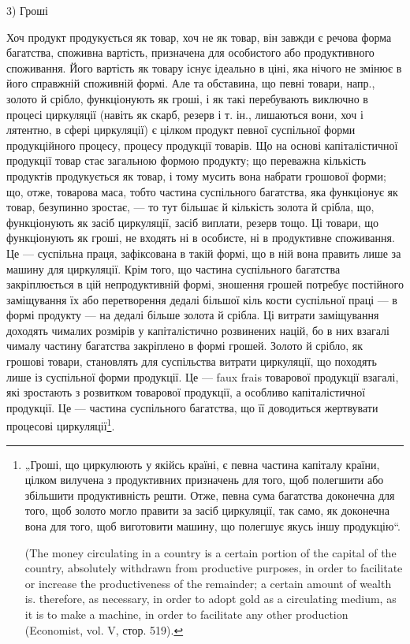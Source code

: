 3) Гроші

Хоч продукт продукується як товар, хоч не як товар, він завжди є
речова форма багатства, споживна вартість, призначена для особистого
або продуктивного споживання. Його вартість як товару існує ідеально
в ціні, яка нічого не змінює в його справжній споживній формі. Але та
обставина, що певні товари, напр., золото й срібло, функціонують як
гроші, і як такі перебувають виключно в процесі циркуляції (навіть як
скарб, резерв і т. ін., лишаються вони, хоч і лятентно, в сфері
циркуляції) є цілком продукт певної суспільної форми продукційного
процесу, процесу продукції товарів. Що на основі капіталістичної продукції
товар стає загальною формою продукту; що переважна кількість
продуктів продукується як товар, і тому мусить вона набрати грошової
форми; що, отже, товарова маса, тобто частина суспільного багатства,
яка функціонує як товар, безупинно зростає, — то тут більшає й кількість
золота й срібла, що, функціонують як засіб циркуляції, засіб виплати,
резерв тощо. Ці товари, що функціонують як гроші, не входять ні в
особисте, ні в продуктивне споживання. Це — суспільна праця, зафіксована
в такій формі, що в ній вона править лише за машину для циркуляції.
Крім того, що частина суспільного багатства закріплюється в цій
непродуктивній формі, зношення грошей потребує постійного заміщування
їх або перетворення дедалі більшої кіль кости суспільної праці — в
формі продукту — на дедалі більше золота й срібла. Ці витрати заміщування
доходять чималих розмірів у капіталістично розвинених націй, бо
в них взагалі чималу частину багатства закріплено в формі грошей.
Золото й срібло, як грошові товари, становлять для суспільства витрати
циркуляції, що походять лише із суспільної форми продукції. Це — faux frais
товарової продукції взагалі, які зростають з розвитком товарової продукції,
а особливо капіталістичної продукції. Це — частина суспільного
багатства, що її доводиться жертвувати процесові циркуляції\footnote{
„Гроші, що циркулюють у якійсь країні, є певна частина капіталу
країни, цілком вилучена з продуктивних призначень для того, щоб полегшити
або збільшити продуктивність решти. Отже, певна сума багатства доконечна
для того, щоб золото могло правити за засіб циркуляції, так само, як доконечна
вона для того, щоб виготовити машину, що полегшує якусь іншу
продукцію“.

(The money circulating in a country is a certain portion of the capital of the
country, absolutely withdrawn from productive purposes, in order to facilitate
or increase the productiveness of the remainder; a certain amount of wealth
is. therefore, as necessary, in order to adopt gold as a circulating medium,
as it is to make a machine, in order to facilitate any other production (Economist,
vol. V, стор. 519).
}.

